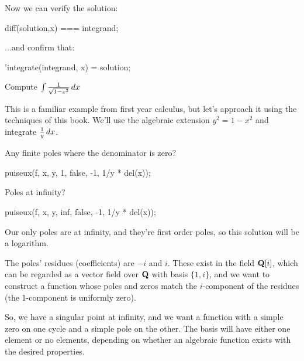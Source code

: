 Now we can verify the solution:

\begin{maximablock}
diff(solution,x) === integrand;
\end{maximablock}

...and confirm that:

\begin{maximablock}
'integrate(integrand, x) = solution;
\end{maximablock}



\endexample


\vfill\eject
{}

\example Compute $\int {1\over{\sqrt{1-x^2}}} \,dx$

This is a familiar example from first year calculus, but let's
approach it using the techniques of this book.  We'll
use the algebraic extension $y^2=1-x^2$ and integrate ${1\over
y}\,dx$.


Any finite poles where the denominator is zero?

\begin{maximablock}
puiseux(f, x, y, 1, false,
        -1, 1/y * del(x));
\end{maximablock}

Poles at infinity?

\begin{maximablock}
puiseux(f, x, y, inf, false,
        -1, 1/y * del(x));
\end{maximablock}

Our only poles are at infinity, and they're first order poles,
so this solution will be a logarithm.

The poles' residues (coefficients) are $-i$ and $i$.  These
exist in the field ${\bf Q}[i]$, which can be regarded as a vector
field over ${\bf Q}$ with basis $\{1, i\}$, and we want to construct a
function whose poles and zeros match the $i$-component of the residues
(the 1-component is uniformly zero).

So, we have a singular point at infinity, and we want a function with
a simple zero on one cycle and a simple pole on the other.
The basis will have either one element or no elements, depending
on whether an algebraic function exists with the desired properties.

